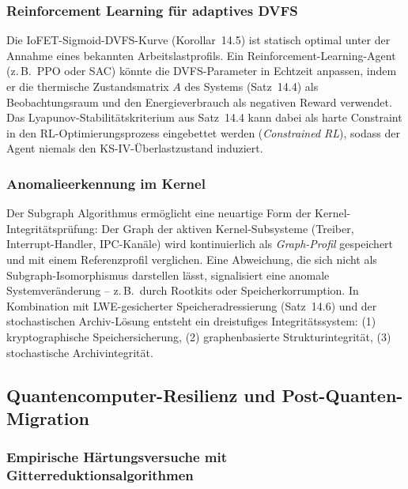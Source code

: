 ﻿\documentclass[a4paper,12pt]{scrreprt}
\theoremstyle{definition}
\begin{document}
	\subsubsection{Reinforcement Learning für adaptives DVFS}
	
	Die IoFET-Sigmoid-DVFS-Kurve (Korollar~14.5) ist statisch optimal
	unter der Annahme eines bekannten Arbeitslastprofils. Ein Reinforcement-Learning-Agent
	(z.\,B.\ PPO oder SAC) könnte die DVFS-Parameter in Echtzeit anpassen,
	indem er die thermische Zustandsmatrix $A$ des Systems (Satz~14.4)
	als Beobachtungsraum und den Energieverbrauch als negativen Reward verwendet.
	Das Lyapunov-Stabilitätskriterium aus Satz~14.4 kann dabei als
	harte Constraint in den RL-Optimierungsprozess eingebettet werden
	(\emph{Constrained RL}), sodass der Agent niemals den KS-IV-Überlastzustand
	induziert.
	
	\subsubsection{Anomalieerkennung im Kernel}
	
	Der Subgraph Algorithmus \cite{Epp2026subgraph} ermöglicht eine neuartige
	Form der Kernel-Integritätsprü\-fung: Der Graph der aktiven Kernel-Subsysteme
	(Treiber, Interrupt-Handler, IPC-Kanäle) wird kontinuierlich als
	\emph{Graph-Profil} gespeichert und mit einem Referenzprofil verglichen.
	Eine Abweichung, die sich nicht als Subgraph-Isomorphismus darstellen lässt,
	signalisiert eine anomale Systemveränderung -- z.\,B.\ durch Rootkits oder
	Speicherkorrumption. In Kombination mit LWE-gesicherter Speicheradressierung
	(Satz~14.6) und der stochastischen Archiv-Lösung \cite{Epp2026archv}
	entsteht ein dreistufiges Integritätssystem:
	(1) kryptographische Speichersicherung,
	(2) graphenbasierte Strukturintegrität,
	(3) stochastische Archivintegrität.
	
	\subsection{Quantencomputer-Resilienz und Post-Quanten-Migration}
	
	\subsubsection{Empirische Härtungsversuche mit Gitterreduktionsalgorithmen}
	
\end{document}
